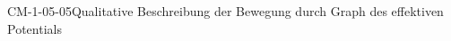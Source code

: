 
\begin{CONC}{CM-1-05-05}{Qualitative Beschreibung der Bewegung durch Graph des effektiven Potentials}
\end{CONC}
